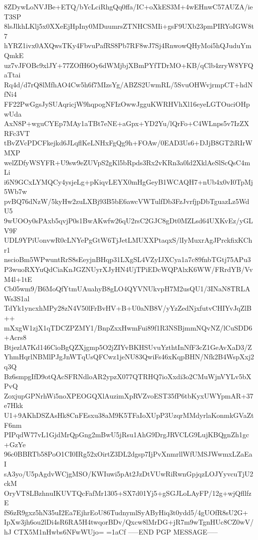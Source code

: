 8ZDywLoNVJBe+ETQ/bYcLciRhgQq0ffa/IC+oXkES3M+4wEHnwC57AUZA/ieT3SP
8lsJlkhLKlj5x0XXeEjHpIny0MDuumrsZTNHCSMIi+gsF9UXb23pmPIRYoIGW8t7
hYRZ1ivx0AXQwsTKy4FbvuPafRS8Pb7RF8wJ7Sj4RnwowQHyMoi5hQJuduYmQmkE
uz7vJFOBc9xlJY+77ZOfH6Oy6dWMjbjXBmPYfTDrMO+KB/qClb4zryW8YFQaTtai
Rq4d/d7rQ8lMfhAO4Cw5h6f7MIzsYg/ABZS2UwmRL/5SvuOHWvjrmpCT+hdNfNi4
FF22PwGgsJySUAqricjW9hqpogNFIzOwwJgguKWRHVhXl16eyeLGTOuciOHpwUda
AxN8P+wguCYEp7MAy1aTBt7eNE+aGpx+YD2Yu/lQrFo+C4WLnps5v7IzZXRFc3VT
tBvZVcPDCFkejkd6JLqflKeLNHxFgQg9h+FOAw/0EAD3Us6+DJjB8GT2iRIrWMXP
welZDfyWSYFR+U9sw9eZUVpS2gKl5bRpds3Rx2vKRn3a0ld2XklAeSlScQsC4mLi
i6N9GCxLYMQCy4ysjeLg+pKiqvLEYX0mHgGeyB1WCAQH7+nUb4x0vI0TpMj5Wb7w
pvBQ76dNzW/5kyHw2zuLXBj93B5bE6awcVWTulfDb3FzJvrfjpDbTguazLz5WdU5
9wUOOy0sPAxb5qvjP0s1BwAKwfw26qU2rsC2GJC8gDt0MZLsd64UXKvEz/yGLV9F
UDL9YPiUonvwR0cLNYePgGtW6TjJetLMUXXPtaqxS/lIyMuxrAgJPrckfixKChr1
nscioBm5WPwuntRrS8sEeyjnBHqp31LXgSL4VZyIJXCya1a7c89fnbTGtj75APu3
P3wuoRXYuQdCiaKnJGZNUyrXJyHN4UjTPiEDcWQPAlxK6WW/FRrdYB/VvM4l+1tE
Cb05wm9/B6MoQfYtmUAuahyB8gLO4QYVNUkvpH7M2usQU1/3INaN8TRLAWs3S1al
TdYk1yncxhMPy28zN4V50lFrBvHV+B+U0aNB8V/yYzZedNjxfutvCHIYvJqZlB++
mXxgW1zjX1qTDCZPZMY1/BnpZxxHwmFui89f1R3NSBjmmNQvNZ/lCuSDD6+Acrs8
BtjezlA7Kd146CioBgQZXjgmp5O2jZIYvBKHSUvuYzthtInNfF3cZ1GeAvXaD3/Z
YhmHqrlNBMlPJgJnWTqUsQFCwz1jeNU83QwiFs46xKqpBHN/Nfk2B4WspXxj2q3Q
Bz6smpgIfD9otQAcSFRNdloAR2ypzX077QTRHQ7ioXxdi3o2CMuWjnVYLv5bXPvQ
ZoxjupGPNrhWi5noXPEOGQXlAuzimXpRVZvoEST35fP6tbKyxUWYpmAR+37e7Hkk
U1+9AKhDSZAsHk8CnFEsxu38aM9K5TFaIoXUpP3UzqrMMdyrlaKonmkGVaZtF6nm
PIPqdW77vL1GjdMrQpGng2mBwU5jRsu1AhG9DrgJRVCLG9LujKBQgnZh1gc+GzYe
96c0BBRTb58PoO1CI0IRg52xOirtZ3DL2dgsp7IjPvXnmrllWfUMSJWwmxLZaEaI
sA3yo/U5pAgdvWCjgMSO/KWIuwi5pAt2JzDtVUwRiRwnGpjqzLOJYyvcuTjU2ckM
OryVT8LBzhnuIKUVTQcFafMr1305+SX7d01Yj5+gSGJLoLAyFP/12g+wjQfllfzE
fS6zR9gxz5hN35uI2Ea7EjhrEoU86TudnymlSyAByHiq3t0ydd5/4gUOfR8sU2G+
IpXw3jh6ou2lDi4sR6RA5H4twqorBDv/Qxcw8lMrDG+jR7m9wTgnHUc8CZ0wV/hJ
CTX5M1nHwbs6NFwWUjo=
=1aCf
-----END PGP MESSAGE-----
